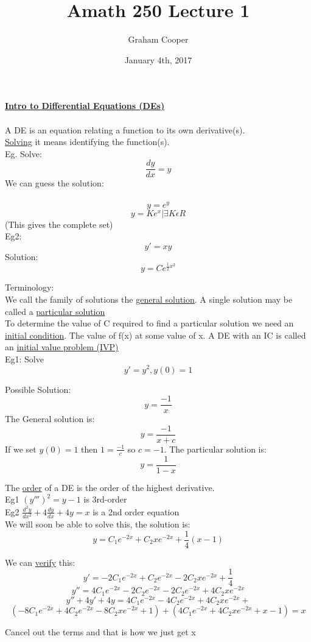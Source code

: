\documentclass[12pt]{article}
\title{\vspace{-15ex}Amath 250 Lecture 1\vspace{-1ex}}
\date{January 4th, 2017}
\author{Graham Cooper}
\newcommand{\myt}[1]{\textbf{\underline{#1}}}
\begin{document}
	\maketitle
	
	\myt{Intro to Differential Equations (DEs)}\\\\
	A DE is an equation relating a function to its own derivative(s).\\
	\underline{Solving} it means identifying the function(s).\\
	Eg. Solve:\\
	$$ \frac{dy}{dx} = y$$
	We can guess the solution:\\\\
	$$y = e^y$$
	$$y = Ke^x | \exists K \epsilon R$$
	(This gives the complete set)\\
	
	Eg2:\\
	$$ y' = xy $$
	Solution:\\
	$$ y = Ce^{\frac{1}{2}x^2}$$
	
	Terminology:\\
	We call the family of solutions the \underline{general solution}. A single solution may be called a \underline{particular solution}\\
	
	To determine the value of C required to find a particular solution we need an \underline{initial condition}. The value of f(x) at some value of x. A DE with an IC is called an \underline{initial value problem (IVP)}\\
	
	Eg1: Solve\\
	$$y' = y^2, y(0) = 1$$
	
	Possible Solution:\\
	$$y = \frac{-1}{x}$$
	The General solution is:\\
	$$y = \frac{-1}{x + c}$$
	If we set $y(0) = 1$ then $1 = \frac{-1}{c}$ so $c = -1$. The particular solution is:\\
	$$y = \frac{1}{1-x}$$
	
	The \underline{order} of a DE is the order of the highest derivative. \\
	Eg1 $(y''')^2 = y-1$ is 3rd-order\\
	Eg2 $\frac{d^2y}{dx^2} + 4\frac{dy}{dx} + 4y = x$ is a 2nd order equation\\
	We will soon be able to solve this, the solution is:\\
	$$y = C_1e^{-2x} + C_2xe^{-2x} + \frac{1}{4}(x-1)$$
	
	We can \underline{verify} this:\\
	$$y' = -2C_1e^{-2x} + C_2e^{-2x}-2C_2xe^{-2x} + \frac{1}{4}$$
	$$y'' = 4C_1e^{-2x} - 2C_2e^{-2x} - 2C_2e^{-2x} + 4C_2xe^{-2x}$$
	$$y'' + 4y' + 4y = 4C_1e^{-2x}-4C_2e^{-2x} + 4C_2xe^{-2x} +$$ 
	$$ (-8C_1e^{-2x} +  4C_2e^{-2x} - 8C_2xe^{-2x} + 1) + (4C_1e^{-2x} + 4C_2xe^{-2x} + x - 1) = x$$
	
	Cancel out the terms and that is how we just get x\\
	
	
	
	
\end{document}
